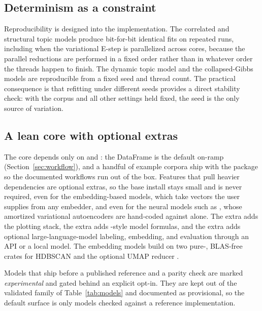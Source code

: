 \documentclass[article]{jss}
\begin{document}
\subsection{Determinism as a constraint}

Reproducibility is designed into the implementation. The correlated and
structural topic models produce bit-for-bit identical fits on repeated runs,
including when the variational E-step is parallelized across cores, because the
parallel reductions are performed in a fixed order rather than in whatever order
the threads happen to finish. The dynamic topic model and the collapsed-Gibbs
models are reproducible from a fixed seed and thread count. The practical
consequence is that refitting under different seeds provides a direct stability
check: with the corpus and all other settings held fixed, the seed is the only
source of variation.

\subsection{A lean core with optional extras}

The core depends only on  and : the DataFrame is the
default on-ramp (Section~\ref{sec:workflow}), and a handful of example corpora
ship with the package so the documented workflows run out of the box. Features
that pull heavier dependencies are optional extras, so the base install stays
small and  is never required, even for the embedding-based models,
which take vectors the user supplies from any embedder, and even for the neural
models such as , whose amortized variational autoencoders are
hand-coded against  alone. The  extra adds the plotting
stack, the  extra adds -style model formulas, and the
 extra adds optional large-language-model labeling, embedding, and
evaluation through an API or a local model. The embedding models build on two
pure-, BLAS-free crates for HDBSCAN \citep{campello2013hdbscan}
and the optional UMAP reducer \citep{mcinnes2018umap}.

Models that ship before a published reference and a parity check are marked
\emph{experimental} and gated behind an explicit opt-in. They are kept out of the
validated family of Table~\ref{tab:models} and documented as provisional, so the
default surface is only models checked against a reference implementation.

\end{document}
